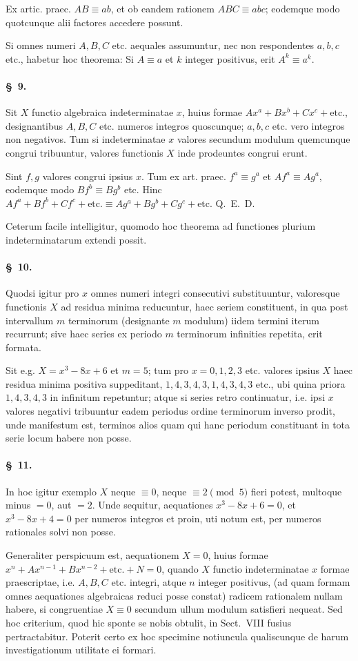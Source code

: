 \documentclass[12pt,a4paper]{article}
\theoremstyle{plain}
\theoremstyle{definition}
\theoremstyle{remark}
\newcommand{\art}[1]{\paragraph{\S\ #1.}}
\begin{document}
Ex artic. praec. $AB \equiv ab$, et ob eandem rationem $ABC \equiv abc$; eodemque modo quotcunque alii factores accedere possunt.

Si omnes numeri $A, B, C$ etc. aequales assumuntur, nec non respondentes $a, b, c$ etc., habetur hoc theorema: Si $A \equiv a$ et $k$ integer positivus, erit $A^k \equiv a^k$.

\art{9}
Sit $X$ functio algebraica indeterminatae $x$, huius formae $Ax^a + Bx^b + Cx^c + \text{etc.}$, designantibus $A, B, C$ etc. numeros integros quoscunque; $a, b, c$ etc. vero integros non negativos. Tum si indeterminatae $x$ valores secundum modulum quemcunque congrui tribuuntur, valores functionis $X$ inde prodeuntes congrui erunt.

Sint $f, g$ valores congrui ipsius $x$. Tum ex art. praec. $f^a \equiv g^a$ et $Af^a \equiv Ag^a$, eodemque modo $Bf^b \equiv Bg^b$ etc. Hinc $Af^a + Bf^b + Cf^c + \text{etc.} \equiv Ag^a + Bg^b + Cg^c + \text{etc.}$ \hfill Q.~E.~D.

Ceterum facile intelligitur, quomodo hoc theorema ad functiones plurium indeterminatarum extendi possit.

\art{10}
Quodsi igitur pro $x$ omnes numeri integri consecutivi substituuntur, valoresque functionis $X$ ad residua minima reducuntur, haec seriem constituent, in qua post intervallum $m$ terminorum (designante $m$ modulum) iidem termini iterum recurrunt; sive haec series ex periodo $m$ terminorum infinities repetita, erit formata.

Sit e.g. $X = x^3 - 8x + 6$ et $m = 5$; tum pro $x = 0, 1, 2, 3$ etc. valores ipsius $X$ haec residua minima positiva suppeditant, $1, 4, 3, 4, 3, 1, 4, 3, 4, 3$ etc., ubi quina priora $1, 4, 3, 4, 3$ in infinitum repetuntur; atque si series retro continuatur, i.e. ipsi $x$ valores negativi tribuuntur eadem periodus ordine terminorum inverso prodit, unde manifestum est, terminos alios quam qui hanc periodum constituant in tota serie locum habere non posse.

\art{11}
In hoc igitur exemplo $X$ neque $\equiv 0$, neque $\equiv 2 \pmod{5}$ fieri potest, multoque minus $= 0$, aut $= 2$. Unde sequitur, aequationes $x^3 - 8x + 6 = 0$, et $x^3 - 8x + 4 = 0$ per numeros integros et proin, uti notum est, per numeros rationales solvi non posse.

Generaliter perspicuum est, aequationem $X = 0$, huius formae $x^n + Ax^{n-1} + Bx^{n-2} + \text{etc.} + N = 0$, quando $X$ functio indeterminatae $x$ formae praescriptae, i.e. $A, B, C$ etc. integri, atque $n$ integer positivus, (ad quam formam omnes aequationes algebraicas reduci posse constat) radicem rationalem nullam habere, si congruentiae $X \equiv 0$ secundum ullum modulum satisfieri nequeat. Sed hoc criterium, quod hic sponte se nobis obtulit, in Sect.~VIII fusius pertractabitur. Poterit certo ex hoc specimine notiuncula qualiscunque de harum investigationum utilitate ei formari.
\end{document}
